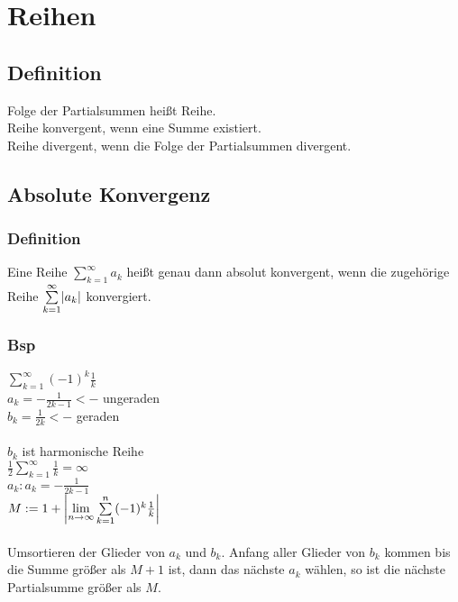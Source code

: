 \documentclass[.../mainfile.tex]{subfiles}
\begin{document}
	
	\section{Reihen}	
	
	\subsection{Definition}
	Folge der Partialsummen heißt Reihe.\\
	Reihe konvergent, wenn eine Summe existiert.\\
	Reihe divergent, wenn die Folge der Partialsummen divergent.\\
	
	\subsection{Absolute Konvergenz}
	\subsubsection{Definition}
	Eine Reihe $\sum \limits^\infty_{k=1}a_{k}$ heißt genau dann absolut konvergent, wenn die zugehörige Reihe $\sum \limits^\infty_{k=1} \abs*{a_{k}}$ konvergiert.
	\subsubsection*{Bsp}
	$\sum \limits^\infty_{k=1}(-1)^{k}\frac{1}{k}$\\
	$a_{k}=-\frac{1}{2k-1}  <-$  ungeraden\\
	$b_{k}=\frac{1}{2k}  <-$  geraden\\\\
	$b_{k}$ ist harmonische Reihe\\
	$\frac{1}{2}\sum \limits^\infty_{k=1}\frac{1}{k}=\infty$\\
	$a_{k}: a_{k} =-\frac{1}{2k-1}$\\
	$M:=1+\abs*{\lim\limits_{n \rightarrow \infty}{\sum \limits^n_{k=1}}(-1)^{k}\frac{1}{k}}$\\\\
	Umsortieren der Glieder von $ a_{k} $ und $ b_{k} $. Anfang aller Glieder von $ b_{k} $ kommen bis die Summe größer als $M+1$ ist, dann das nächste $ a_{k} $ wählen, so ist die nächste Partialsumme größer als $M$.
\end{document}
